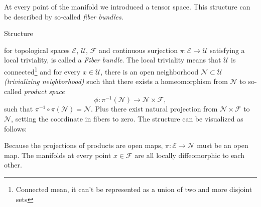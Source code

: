 At every point of the manifold we introduced a tensor space. This structure can be described by so-called \emph{fiber bundles}.
\begin{definition}
    \label{def:fiberBundle}
    Structure 
\begin{center}
\end{center}
    for topological spaces $\mathcal{E}$, $\mathcal{U}$, $\mathcal F$ and continuous surjection $\pi: \mathcal{E}\rightarrow \mathcal{U}$ satisfying a local triviality, is called a \emph{Fiber bundle}. The local triviality means that $\mathcal{U}$ is connected\footnote{Connected mean, it can't be represented as a union of two and more disjoint sets} and for every $x\in \mathcal{U}$, there is an open neighborhood $\mathcal{N}\subset \mathcal{U}$ \emph{(trivializing neighborhood)} such that there exists a homeomorphism from $\mathcal{N}$ to so-called \emph{product space}
    $$\phi: \pi^{-1}(\mathcal{N})\rightarrow \mathcal{N}\times \mathcal{F},$$
    such that $\pi^{-1}\circ \pi(\mathcal{N})=\mathcal{N}$. Plus there exist natural projection from $\mathcal{N}\times \mathcal{F}$ to $\mathcal N$, setting the coordinate in fibers to zero. The structure can be visualized as follows: 

    \begin{figure}[H]
        \centering
    \end{figure}

\end{definition}
Because the projections of products are open maps, $\pi: \mathcal{E}\rightarrow \mathcal{N}$ must be an open map. The manifolds at every point $x\in \mathcal{F}$ are all locally diffeomorphic to each other.

